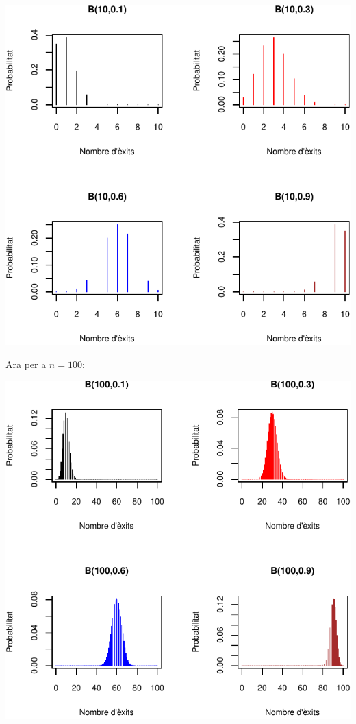 \documentclass[
]{book}
\theoremstyle{definition}
\theoremstyle{definition}
\theoremstyle{definition}
\theoremstyle{remark}
\begin{document}
\begin{center}\includegraphics[width=0.9\linewidth]{Bioestadistica-II_files/figure-latex/unnamed-chunk-35-1} \end{center}

Ara per a \(n=100\):

\begin{center}\includegraphics[width=0.9\linewidth]{Bioestadistica-II_files/figure-latex/unnamed-chunk-36-1} \end{center}
\end{document}
